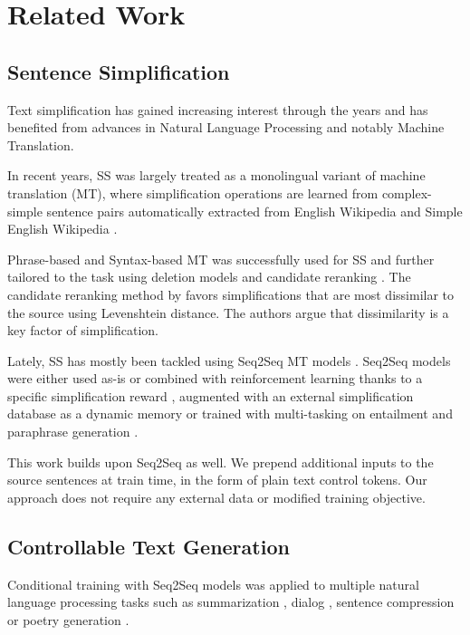 \documentclass[10pt, a4paper]{article}
\begin{document}
\section{Related Work}

\subsection{Sentence Simplification}
Text simplification has gained increasing interest through the years and has benefited from advances in Natural Language Processing and notably Machine Translation.

In recent years, SS was largely treated as a monolingual variant of machine translation (MT), where simplification operations are learned from complex-simple sentence pairs automatically extracted from English Wikipedia and Simple English Wikipedia \cite{zhu2010monolingual,wubben2012sentence}.

Phrase-based and Syntax-based MT was successfully used for SS \cite{zhu2010monolingual} and further tailored to the task using deletion models \cite{coster2011learning} and candidate reranking \cite{wubben2012sentence}.
The candidate reranking method by  favors simplifications that are most dissimilar to the source using Levenshtein distance. The authors argue that dissimilarity is a key factor of simplification.

Lately, SS has mostly been tackled using Seq2Seq MT models \cite{sutskever2014sequence}.
Seq2Seq models were either used as-is \cite{nisioi2017exploring} or combined with reinforcement learning thanks to a specific simplification reward \cite{zhang2017sentence}, augmented with an external simplification database as a dynamic memory \cite{zhao2018integrating} or trained with multi-tasking on entailment and paraphrase generation \cite{guo2018dynamic}.

This work builds upon Seq2Seq as well. We prepend additional inputs to the source sentences at train time, in the form of plain text control tokens. Our approach does not require any external data or modified training objective.


\subsection{Controllable Text Generation}
Conditional training with Seq2Seq models was applied to multiple natural language processing tasks such as summarization \cite{kikuchi2016controlling,fan2017controllable}, dialog \cite{see2019makes}, sentence compression \cite{fevry2018unsupervised,mallinson2018sentence} or poetry generation \cite{ghazvininejad2017hafez}. 
\end{document}
